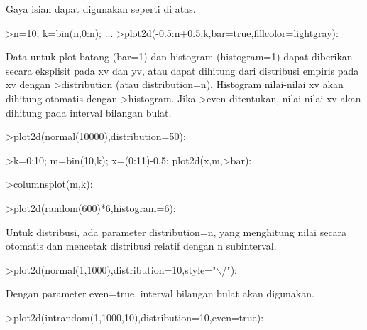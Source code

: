 \documentclass[a4paper,10pt]{article}
\begin{document}
\begin{eulernotebook}
\begin{eulercomment}
\begin{eulercomment}
\begin{eulercomment}
\begin{eulercomment}
\begin{eulercomment}
\begin{eulercomment}
\begin{eulercomment}
Gaya isian dapat digunakan seperti di atas.
\end{eulercomment}
\begin{eulerprompt}
>n=10; k=bin(n,0:n); ...
>plot2d(-0.5:n+0.5,k,bar=true,fillcolor=lightgray):
\end{eulerprompt}
\begin{eulercomment}
Data untuk plot batang (bar=1) dan histogram (histogram=1) dapat diberikan secara
eksplisit pada xv dan yv, atau dapat dihitung dari distribusi empiris pada xv dengan
\textgreater{}distribution (atau distribution=n). Histogram nilai-nilai xv akan dihitung otomatis
dengan \textgreater{}histogram. Jika \textgreater{}even ditentukan, nilai-nilai xv akan dihitung pada interval
bilangan bulat.
\end{eulercomment}
\begin{eulerprompt}
>plot2d(normal(10000),distribution=50):
\end{eulerprompt}
\begin{eulerprompt}
>k=0:10; m=bin(10,k); x=(0:11)-0.5; plot2d(x,m,>bar):
\end{eulerprompt}
\begin{eulerprompt}
>columnsplot(m,k):
\end{eulerprompt}
\begin{eulerprompt}
>plot2d(random(600)*6,histogram=6):
\end{eulerprompt}
\begin{eulercomment}
Untuk distribusi, ada parameter distribution=n, yang menghitung nilai secara otomatis
dan mencetak distribusi relatif dengan n subinterval.
\end{eulercomment}
\begin{eulerprompt}
>plot2d(normal(1,1000),distribution=10,style="\(\backslash\)/"):
\end{eulerprompt}
\begin{eulercomment}
Dengan parameter even=true, interval bilangan bulat akan digunakan.
\end{eulercomment}
\begin{eulerprompt}
>plot2d(intrandom(1,1000,10),distribution=10,even=true):
\end{eulerprompt}
\begin{eulercomment}

\end{eulercomment}
\end{eulercomment}
\end{eulercomment}
\end{eulercomment}
\end{eulercomment}
\end{eulercomment}
\end{eulercomment}
\end{eulernotebook}
\end{document}
